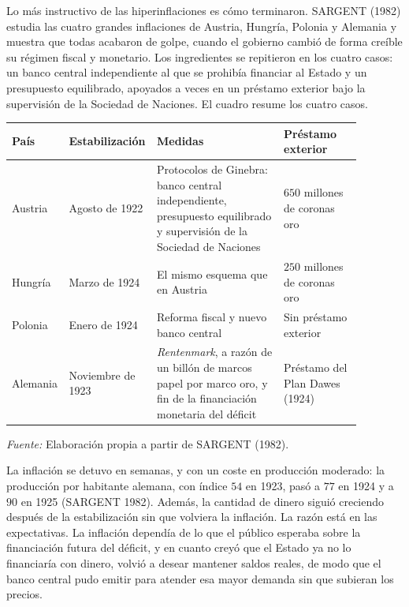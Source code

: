 \documentclass[10pt,a4paper]{article}
\begin{document}
Lo más instructivo de las hiperinflaciones es cómo terminaron. SARGENT (1982) estudia las cuatro grandes inflaciones de Austria, Hungría, Polonia y Alemania y muestra que todas acabaron de golpe, cuando el gobierno cambió de forma creíble su régimen fiscal y monetario. Los ingredientes se repitieron en los cuatro casos: un banco central independiente al que se prohibía financiar al Estado y un presupuesto equilibrado, apoyados a veces en un préstamo exterior bajo la supervisión de la Sociedad de Naciones. El cuadro resume los cuatro casos.

\begin{center}\begin{minipage}{\linewidth}\par\vspace{0.3em}
\begin{tabular}{|p{0.13\linewidth}|p{0.17\linewidth}|p{0.36\linewidth}|p{0.22\linewidth}|}
\hline
\textbf{País} & \textbf{Estabilización} & \textbf{Medidas} & \textbf{Préstamo exterior} \\
\hline
Austria & Agosto de 1922 & Protocolos de Ginebra: banco central independiente, presupuesto equilibrado y supervisión de la Sociedad de Naciones & $650$ millones de coronas oro \\
\hline
Hungría & Marzo de 1924 & El mismo esquema que en Austria & $250$ millones de coronas oro \\
\hline
Polonia & Enero de 1924 & Reforma fiscal y nuevo banco central & Sin préstamo exterior \\
\hline
Alemania & Noviembre de 1923 & \textit{Rentenmark}, a razón de un billón de marcos papel por marco oro, y fin de la financiación monetaria del déficit & Préstamo del Plan Dawes (1924) \\
\hline
\end{tabular}\par\vspace{0.3em} {\small\textit{Fuente: }Elaboración propia a partir de SARGENT (1982).}\end{minipage}\end{center}

La inflación se detuvo en semanas, y con un coste en producción moderado: la producción por habitante alemana, con índice $54$ en 1923, pasó a $77$ en 1924 y a $90$ en 1925 (SARGENT 1982). Además, la cantidad de dinero siguió creciendo después de la estabilización sin que volviera la inflación. La razón está en las expectativas. La inflación dependía de lo que el público esperaba sobre la financiación futura del déficit, y en cuanto creyó que el Estado ya no lo financiaría con dinero, volvió a desear mantener saldos reales, de modo que el banco central pudo emitir para atender esa mayor demanda sin que subieran los precios.
\end{document}

